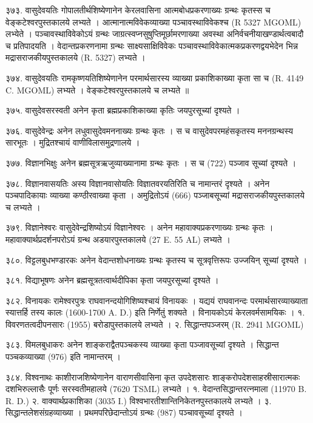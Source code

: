 ३७३. वासुदेवयतिः
गोपालतीर्थशिष्येणानेन केरलवासिना आत्मबोधप्रकरणाख्यः ग्रन्थः कृतस्स च वेङ्कटेश्वरपुस्तकालये लभ्यते । आत्मानात्मविवेकव्याख्या पञ्चावस्थाविवेकश्च (R 5327 MGOML) लभ्येते । पञ्चावस्थाविवेकोऽयं ग्रन्थः जाग्रत्स्वप्नसुषुप्तिमूर्छामरणाख्या अवस्था अनिर्वचनीयाखण्डार्थत्वबादौ च प्रतिपादयति । वेदान्तप्रकरणनामा ग्रन्थः साक्ष्यसाक्षिविवेकः पञ्चावस्थाविवेकात्मकप्रकरणद्वयभेदेन भिन्न मद्रासराजकीयपुस्तकालये (R. 5327) लभ्यते ।

३७४. वासुदेवयतिः
रामकृष्णयतिशिष्येणानेन परमार्थसारस्य व्याख्या प्रकाशिकाख्या कृता सा च (R. 4149 C. MGOML) लभ्यते । वेङ्कटेश्वरपुस्तकालये च लभ्यते ॥

३७५. वासुदेवसरस्वती
अनेन कृता ब्रह्मप्रकाशिकाख्या कृतिः जयपुरसूच्यां दृश्यते ।

३७६. वासुदेवेन्द्रः
अनेन लधुवासुदेवमननाख्यः ग्रन्थः कृतः । स च वासुदेवपरमहंसकृतस्य मननग्रन्थस्य सारभूतः । मुद्रितश्चायं वाणीविलासमुद्रणालये ।

३७७. विज्ञानभिक्षुः
अनेन ब्रह्मसूत्रऋजुव्याख्यानामा ग्रन्थः कृतः । स च (722) पञ्जाव सूच्यां दृश्यते ।

३७८. विज्ञानवासयतिः
अस्य विज्ञानवासोयतिः विज्ञातवरयतिरिति च नामान्तरं दृश्यते । अनेन पञ्चपादिकायाः व्याख्या कण्ठीरवाख्या कृता । अमुद्रितोऽयं (666) पञ्जाबसूच्यां मद्रासराजकीयपुस्तकालये च लभ्यते ।

३७९. विज्ञानेश्वरः
वासुदेवेन्द्रशिष्योऽयं विज्ञानेश्वरः । अनेन महावाक्यप्रकरणाख्यः ग्रन्थः कृतः । महावाक्यार्थप्रदर्शनपरोऽयं ग्रन्थ अडयारपुस्तकालये (27 E. 55 AL) लभ्यते ।

३८०. विट्टलबुधभण्डारकः
अनेन वेदान्तशोधनाख्यः ग्रन्थः कृतस्य च सूत्रवृत्तिरूपः उज्जयिन् सूच्यां दृश्यते ।

३८१. विद्याभूषणः
अनेन ब्रह्मसूत्रतत्वार्थदीपिका कृता जयपुरसूच्यां दृश्यते ।

३८२. विनायकः
रामेश्वरपुत्रः राघवानन्दयोगिशिष्यश्चायं विनायकः । यद्ययं राघवानन्दः परमार्थसारव्याख्याता स्यात्तर्हि तस्य कालः (1600-1700 A. D.) इति निर्णेतुं शक्यते । विनायकोऽयं केरलवर्मसामयिकः ।
१. विवरणतत्वदीपनसारः (1955) बरोडापुस्तकालये लभ्यते ।
२. सिद्धान्तपञ्जरम् (R. 2941 MGOML)

३८३. विमलबुधाकरः
अनेन शाङ्कराद्वैतपञ्चकस्य व्याख्या कृता पञ्जावसूच्यां दृश्यते । सिद्धान्त पञ्चकव्याख्या (976) इति नामान्तरम् ।

३८४. विश्वनाथः
काशीराजशिष्येणानेन वाराणसीवासिना कृत उपदेशसारः शाङ्करोपदेशसाहस्रीसारात्मकः दशभिरुल्लासैः पूर्णः सरस्वतीमहालये (7620 TSML) लभ्यते ।
१. वेदान्तसिद्धान्तरत्नमाला (11970 B. R. D.)
२. वाक्यार्थप्रकाशिका (3035 I.) विश्वभारतीशान्तिनिकेतनपुस्तकालये लभ्यते ।
३. सिद्धान्तलेशसंग्रहव्याख्या । प्रथमपरिछेदान्तोऽयं ग्रन्थः (987) पञ्चावसूच्यां दृश्यते ।

